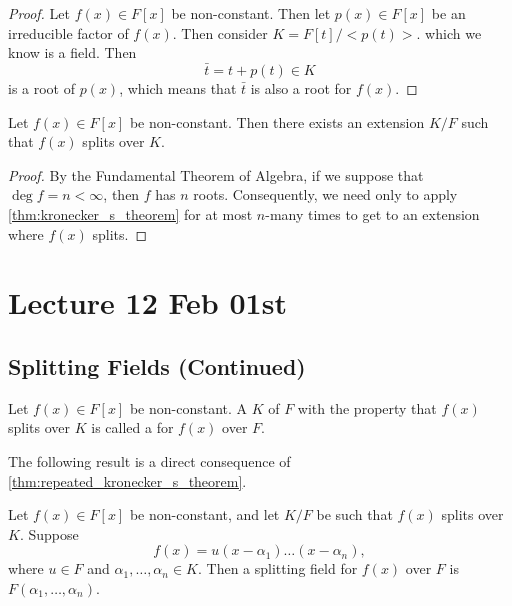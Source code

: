 \documentclass[notoc,notitlepage,nobib]{tufte-book}
\begin{document}
\begin{proof}
  Let $f(x) \in F[x]$ be non-constant. Then let $p(x) \in F[x]$ be an irreducible factor of
  $f(x)$. Then consider $K = F[t] / <p(t)>$. which we know is a field. Then
  \begin{equation*}
    \bar{t} = t + p(t) \in K
  \end{equation*}
  is a root of $p(x)$, which means that $\bar{t}$ is also a root for $f(x)$.
\end{proof}

\begin{thm}\label{thm:repeated_kronecker_s_theorem}
  Let $f(x) \in F[x]$ be non-constant. Then there exists an extension $K / F$ such that
  $f(x)$ splits over $K$.
\end{thm}

\begin{proof}
  By the Fundamental Theorem of Algebra, if we suppose that $\deg f = n < \infty$, then
  $f$ has $n$ roots. Consequently, we need only to apply \cref{thm:kronecker_s_theorem}
  for at most $n$-many times to get to an extension where $f(x)$ splits.
\end{proof}



\chapter{Lecture 12 Feb 01st}%
\label{chp:lecture_12_feb_01st}

\section{Splitting Fields (Continued)}%
\label{sec:splitting_fields_continued}

\begin{defn}\label{defn:splitting_field}
  Let $f(x) \in F[x]$ be non-constant. A  $K$ of $F$ with the
  property that $f(x)$ splits over $K$ is called a  for $f(x)$
  over $F$.
\end{defn}

The following result is a direct consequence of \cref{thm:repeated_kronecker_s_theorem}.

\begin{propo}\label{propo:a_splitting_field_is_generated}
  Let $f(x) \in F[x]$ be non-constant, and let $K / F$ be such that $f(x)$ splits over $K$.
  Suppose
  \begin{equation*}
    f(x) = u(x - \alpha_1) \hdots (x - \alpha_n),
  \end{equation*}
  where $u \in F$ and $\alpha_1, \ldots, \alpha_n \in K$. Then a splitting field for $f(x)$
  over $F$ is $F(\alpha_1, \ldots, \alpha_n)$.
\end{propo}
\end{document}
